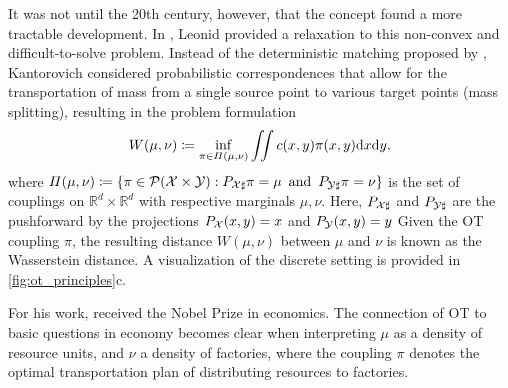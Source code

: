 It was not until the 20th century, however, that the concept found a more tractable development. In \citeyear{kantorovich1942transfer}, Leonid \citeauthor{kantorovich1942transfer} provided a relaxation to this non-convex and difficult-to-solve problem.
Instead of the deterministic matching proposed by \citeauthor{monge1781histoire}, Kantorovich considered probabilistic correspondences that allow for the transportation of mass from a single source point to various target points (mass splitting), resulting in the problem formulation
\begin{equation} \label{eq:kantorovich}
    W(\mu, \nu) \coloneqq \inf_{\pi\in \Pi(\mu,\nu)}\iint c(x, y) \pi(x, y)\mathrm{d}x\mathrm{d}y,
\end{equation}
where $\Pi(\mu, \nu) \coloneqq \left\{\pi \in {\mathcal{P}}(\mathcal{X} \times \mathcal{Y}): P_{{\mathcal{X}} \sharp} \pi=\mu \, \text { and } \, P_{{\mathcal{Y}} \sharp} \pi=\nu\right\}$ is the set of couplings on $\mathbb{R}^d\times\mathbb{R}^d$ with respective marginals $\mu, \nu$. 
Here, $P_{{\mathcal{X}} \sharp}$ and $P_{{\mathcal{Y}} \sharp}$ are the pushforward by the projections $P_{\mathcal{X}} (x, y) = x$ and $P_{\mathcal{Y}} (x, y) = y$
Given the \acrlong{OT} coupling $\pi$, the resulting distance $W(\mu, \nu)$ between $\mu$ and $\nu$ is known as the Wasserstein distance.
A visualization of the discrete setting is provided in \cref{fig:ot_principles}c.

For his work, \citeauthor{kantorovich1942transfer} received the Nobel Prize in economics. The connection of \acrshort{OT} to basic questions in economy becomes clear when interpreting $\mu$ as a density of resource units, and $\nu$ a density of factories, where the coupling $\pi$ denotes the optimal transportation plan of distributing resources to factories.

